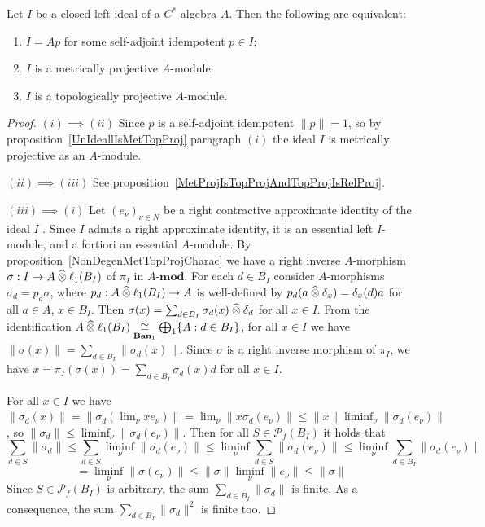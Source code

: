 \begin{theorem}\label{LeftIdealOfCStarAlgMetTopProjCharac} Let $I$ be a closed left
ideal of a $C^*$-algebra $A$. Then the following are equivalent:

\begin{enumerate}[label = (\roman*)]
    \item $I=Ap$ for some self-adjoint idempotent $p\in I$;

    \item $I$ is a metrically projective $A$-module;

    \item $I$ is a topologically projective $A$-module.
\end{enumerate}
\end{theorem}
\begin{proof} $(i)\implies (ii)$ Since $p$ is a self-adjoint idempotent
$\lVert p\rVert=1$, so by proposition~\ref{UnIdeallIsMetTopProj} paragraph $(i)$
the ideal $I$ is metrically projective as an $A$-module.

$(ii)\implies (iii)$ See
proposition~\ref{MetProjIsTopProjAndTopProjIsRelProj}.

$(iii) \implies (i)$ Let ${(e_\nu)}_{\nu\in N}$ be a right contractive
approximate identity of the ideal $I$ \cite[theorem 4.7.79]{HelBanLocConvAlg}.
Since $I$ admits a right approximate identity, it is an essential left
$I$-module, and a fortiori an essential $A$-module. By
proposition~\ref{NonDegenMetTopProjCharac} we have a right inverse $A$-morphism
$\sigma:I\to A\mathbin{\widehat{\otimes}} \ell_1(B_I)$ of $\pi_I$ in $A\text{-}\mathbf{mod}$. For each
$d\in B_I$ consider $A$-morphisms $\sigma_d=p_d\sigma$, where 
$p_d:A\mathbin{\widehat{\otimes}} \ell_1(B_I)\to A$ is well-defined 
by $p_d(a\mathbin{\widehat{\otimes}} \delta_x)=\delta_x(d)a$ for all $a\in A$, $x\in B_I$. Then
$\sigma(x)=\sum_{d\in B_I}\sigma_d(x)\mathbin{\widehat{\otimes}} \delta_d$ for all $x\in I$. From
the identification 
$A\mathbin{\widehat{\otimes}}\ell_1(B_I)\mathrel{\mathop{\cong}\limits_{\mathbf{Ban}_1}}\bigoplus_1 \{ A:d\in B_I \}$, 
for all $x\in I$ we 
have $\lVert\sigma(x)\rVert=\sum_{d\in B_I} \lVert\sigma_d(x)\rVert$. 
Since $\sigma$ is a right inverse morphism of $\pi_I$, we
have $x=\pi_I(\sigma(x))=\sum_{d\in B_I}\sigma_d(x)d$ for all $x\in I$. 

For all $x\in I$ we have 
$\lVert\sigma_d(x)\rVert
=\lVert\sigma_d(\lim_\nu xe_\nu)\rVert
=\lim_\nu\lVert x\sigma_d(e_\nu)\rVert 
\leq\lVert x\rVert\liminf_\nu\lVert\sigma_d(e_\nu)\rVert$, 
so $\lVert\sigma_d\rVert\leq \liminf_\nu\lVert\sigma_d(e_\nu)\rVert$. 
Then for all $S\in\mathcal{P}_{f}(B_I)$ it holds that
\[
\sum_{d\in S}\lVert \sigma_d\rVert
\leq \sum_{d\in S}\liminf_\nu\lVert \sigma_d(e_\nu)\rVert
\leq \liminf_\nu\sum_{d\in S}\lVert \sigma_d(e_\nu)\rVert
\leq \liminf_\nu\sum_{d\in B_I}\lVert \sigma_d(e_\nu) \rVert
\]
\[
=\liminf_{\nu}\lVert\sigma(e_\nu)\rVert
\leq \lVert\sigma\rVert\liminf_{\nu}\lVert e_\nu\rVert
\leq \lVert\sigma\rVert
\]
Since $S\in \mathcal{P}_{f}(B_I)$ is arbitrary, the sum 
$\sum_{d\in B_I}\lVert\sigma_d\rVert$ is finite. As a consequence, the 
sum $\sum_{d\in B_I}\lVert\sigma_d\rVert^2$ is finite too. 


\end{proof}
